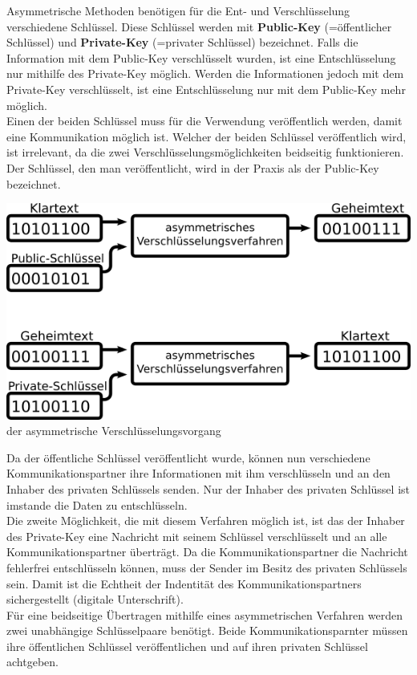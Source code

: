 \documentclass[12pt,a4paper]{report}
\begin{document}
\begin{onehalfspace}
Asymmetrische Methoden benötigen für die Ent- und Verschlüsselung verschiedene Schlüssel. Diese Schlüssel werden mit \textbf{Public-Key} (=öffentlicher Schlüssel) und \textbf{Private-Key} (=privater Schlüssel) bezeichnet. Falls die Information mit dem Public-Key verschlüsselt wurden, ist eine Entschlüsselung nur mithilfe des Private-Key möglich. Werden die Informationen jedoch mit dem Private-Key verschlüsselt, ist eine Entschlüsselung nur mit dem Public-Key mehr möglich.\\
Einen der beiden Schlüssel muss für die Verwendung veröffentlich werden, damit eine Kommunikation möglich ist. Welcher der beiden Schlüssel veröffentlich wird, ist irrelevant, da die zwei Verschlüsselungsmöglichkeiten beidseitig funktionieren. Der Schlüssel, den man veröffentlicht, wird in der Praxis als der Public-Key bezeichnet.\\

\begin{center}
\includegraphics[scale=3]{img/asym.png}\\
der asymmetrische Verschlüsselungsvorgang
\end{center}

Da der öffentliche Schlüssel veröffentlicht wurde, können nun verschiedene Kommunikationspartner ihre Informationen mit ihm verschlüsseln und an den Inhaber des privaten Schlüssels senden. Nur der Inhaber des privaten Schlüssel ist imstande die Daten zu entschlüsseln.\\
Die zweite Möglichkeit, die mit diesem Verfahren möglich ist, ist das der Inhaber des Private-Key eine Nachricht mit seinem Schlüssel verschlüsselt und an alle Kommunikationspartner überträgt. Da die Kommunikationspartner die Nachricht fehlerfrei entschlüsseln können, muss der Sender im Besitz des privaten Schlüssels sein. Damit ist die Echtheit der Indentität des Kommunikationspartners sichergestellt (digitale Unterschrift).\\
Für eine beidseitige Übertragen mithilfe eines asymmetrischen Verfahren werden zwei unabhängige Schlüsselpaare benötigt. Beide Kommunikationsparnter müssen ihre öffentlichen Schlüssel veröffentlichen und auf ihren privaten Schlüssel achtgeben.


\end{onehalfspace}
\end{document}
